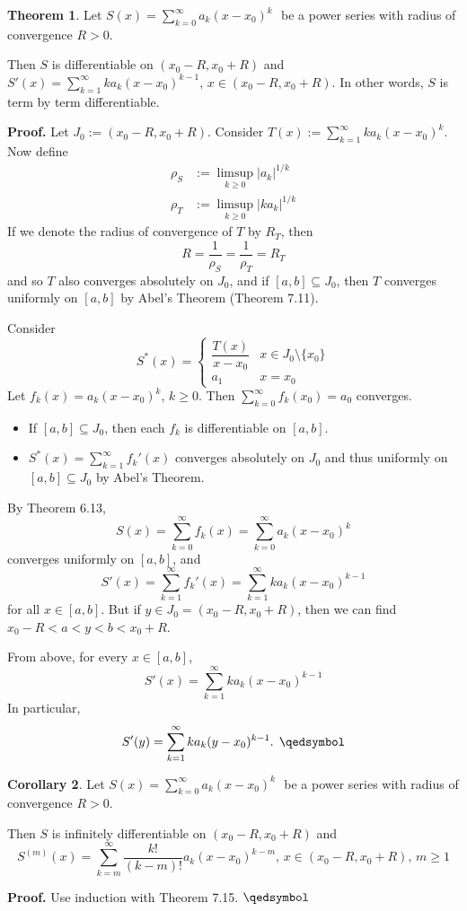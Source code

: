 \documentclass[11pt]{article}
\theoremstyle{definition}
\newtheorem{thm}{Theorem}[section]
\newtheorem{cor}[thm]{Corollary}
\newcommand{\powerseries}{\ensuremath{S(x) = \sum_{k=0}^\infty a_k (x - x_0)^k \text{ }}}
\begin{document}
\begin{thm}
Let \powerseries be a power series with radius of convergence $R > 0$.

Then $S$ is differentiable on $(x_0 - R, x_0 + R)$ and $S'(x) = \sum_{k=1}^\infty ka_k(x-x_0)^{k-1}$, $x \in (x_0 - R, x_0 + R)$. In other words, $S$ is term by term differentiable.
\end{thm}
\textbf{Proof.} Let $J_0 := (x_0 - R, x_0 + R)$. Consider $T(x) := \sum_{k=1}^\infty ka_k(x - x_0)^k$. Now define
\begin{align*}
\rho_S & := \limsup_{k\geq0} |a_k|^{1/k} \\
\rho_T & := \limsup_{k\geq0} |ka_k|^{1/k}
\end{align*}
If we denote the radius of convergence of $T$ by $R_T$, then
$$R = \frac{1}{\rho_S} = \frac{1}{\rho_T} = R_T$$
and so $T$ also converges absolutely on $J_0$, and if $[a, b] \subseteq J_0$, then $T$ converges uniformly on $[a, b]$ by Abel's Theorem (Theorem 7.11). 

Consider
$$S^*(x) = \begin{cases} \dfrac{T(x)}{x - x_0} & x \in J_0 \setminus \{x_0\} \\ a_1 & x = x_0 \end{cases}$$
Let $f_k(x) = a_k(x - x_0)^k$, $k \geq 0$. Then $\sum_{k=0}^\infty f_k(x_0) = a_0$ converges.
\begin{itemize} \vspace{-0.2cm}
\item If $[a, b] \subseteq J_0$, then each $f_k$ is differentiable on $[a, b]$.
\item $S^*(x) = \sum_{k=1}^\infty f_k'(x)$ converges absolutely on $J_0$ and thus uniformly on $[a, b] \subseteq J_0$ by Abel's Theorem.
\end{itemize}
By Theorem 6.13, 
$$S(x) = \sum_{k=0}^\infty f_k(x) = \sum_{k=0}^\infty a_k(x - x_0)^k$$
converges uniformly on $[a, b]$, and
$$S'(x) = \sum_{k=1}^\infty f_k'(x) = \sum_{k=1}^\infty ka_k(x - x_0)^{k-1}$$
for all $x \in [a, b]$. But if $y \in J_0 = (x_0 - R, x_0 + R)$, then we can find $x_0 - R < a < y < b < x_0 + R$.

From above, for every $x \in [a, b]$,
$$S'(x) = \sum_{k=1}^\infty ka_k (x - x_0)^{k-1}$$
In particular,
$$S'(y) = \sum_{k=1}^\infty ka_k (y - x_0)^{k-1} \text{. } \qedsymbol$$

\begin{cor}
Let \powerseries be a power series with radius of convergence $R > 0$.

Then $S$ is infinitely differentiable on $(x_0 - R, x_0 + R)$ and
$$S^{(m)}(x) = \sum_{k=m}^\infty \frac{k!}{(k-m)!} a_k (x - x_0)^{k-m}, \, x \in (x_0 - R, x_0 + R), \, m \geq 1$$
\end{cor}
\textbf{Proof.} Use induction with Theorem 7.15. $\qedsymbol$
\end{document}

